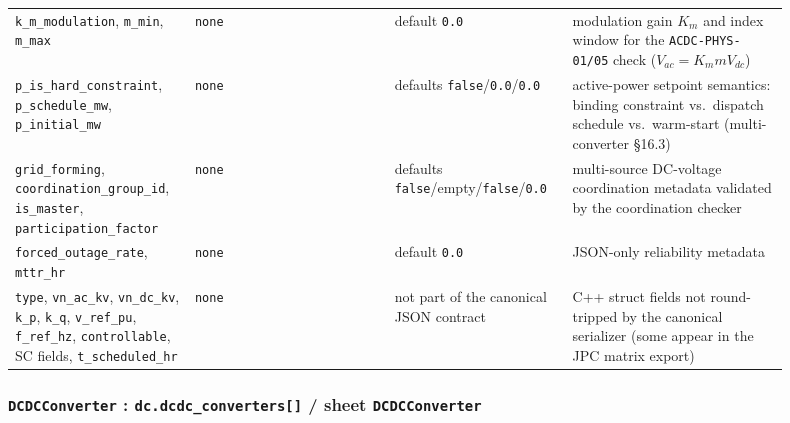 \begin{longtable}{L{0.20\linewidth}L{0.24\linewidth}L{0.20\linewidth}L{0.26\linewidth}}
\texttt{k\_m\_modulation}, \texttt{m\_min}, \texttt{m\_max} & \texttt{none} & default \texttt{0.0} & modulation gain \(K_m\) and index window for the \texttt{ACDC-PHYS-01/05} check (\(V_{ac}=K_m m V_{dc}\)) \\
\texttt{p\_is\_hard\_constraint}, \texttt{p\_schedule\_mw}, \texttt{p\_initial\_mw} & \texttt{none} & defaults \texttt{false}/\texttt{0.0}/\texttt{0.0} & active-power setpoint semantics: binding constraint vs.\ dispatch schedule vs.\ warm-start (multi-converter \S16.3) \\
\texttt{grid\_forming}, \texttt{coordination\_group\_id}, \texttt{is\_master}, \texttt{participation\_factor} & \texttt{none} & defaults \texttt{false}/empty/\texttt{false}/\texttt{0.0} & multi-source DC-voltage coordination metadata validated by the coordination checker \\
\texttt{forced\_outage\_rate}, \texttt{mttr\_hr} & \texttt{none} & default \texttt{0.0} & JSON-only reliability metadata \\
\texttt{type}, \texttt{vn\_ac\_kv}, \texttt{vn\_dc\_kv}, \texttt{k\_p}, \texttt{k\_q}, \texttt{v\_ref\_pu}, \texttt{f\_ref\_hz}, \texttt{controllable}, SC fields, \texttt{t\_scheduled\_hr} & \texttt{none} & not part of the canonical JSON contract & C++ struct fields not round-tripped by the canonical serializer (some appear in the JPC matrix export) \\
\bottomrule
\end{longtable}

\subsubsection*{\texttt{DCDCConverter} : \texttt{dc.dcdc\_converters[]} / sheet \texttt{DCDCConverter}}

